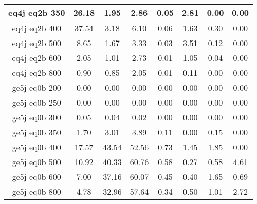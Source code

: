 \begin{longtable}{| c | c | c | c | c | c | c | c  | }
eq4j eq2b 350 & 26.18 & 1.95 & 2.86 & 0.05 & 2.81 & 0.00 & 0.00\\ \hline 
eq4j eq2b 400 & 37.54 & 3.18 & 6.10 & 0.06 & 1.63 & 0.30 & 0.00\\ \hline 
eq4j eq2b 500 & 8.65 & 1.67 & 3.33 & 0.03 & 3.51 & 0.12 & 0.00\\ \hline 
eq4j eq2b 600 & 2.05 & 1.01 & 2.73 & 0.01 & 1.05 & 0.04 & 0.00\\ \hline 
eq4j eq2b 800 & 0.90 & 0.85 & 2.05 & 0.01 & 0.11 & 0.00 & 0.00\\ \hline 
ge5j eq0b 200 & 0.00 & 0.00 & 0.00 & 0.00 & 0.00 & 0.00 & 0.00\\ \hline 
ge5j eq0b 250 & 0.00 & 0.00 & 0.00 & 0.00 & 0.00 & 0.00 & 0.00\\ \hline 
ge5j eq0b 300 & 0.05 & 0.04 & 0.02 & 0.00 & 0.00 & 0.00 & 0.00\\ \hline 
ge5j eq0b 350 & 1.70 & 3.01 & 3.89 & 0.11 & 0.00 & 0.15 & 0.00\\ \hline 
ge5j eq0b 400 & 17.57 & 43.54 & 52.56 & 0.73 & 1.45 & 1.85 & 0.00\\ \hline 
ge5j eq0b 500 & 10.92 & 40.33 & 60.76 & 0.58 & 0.27 & 0.58 & 4.61\\ \hline 
ge5j eq0b 600 & 7.00 & 37.16 & 60.07 & 0.45 & 0.40 & 1.65 & 0.69\\ \hline 
ge5j eq0b 800 & 4.78 & 32.96 & 57.64 & 0.34 & 0.50 & 1.01 & 2.72\\ \hline 
    \hline 
    \hline 
\end{longtable}

